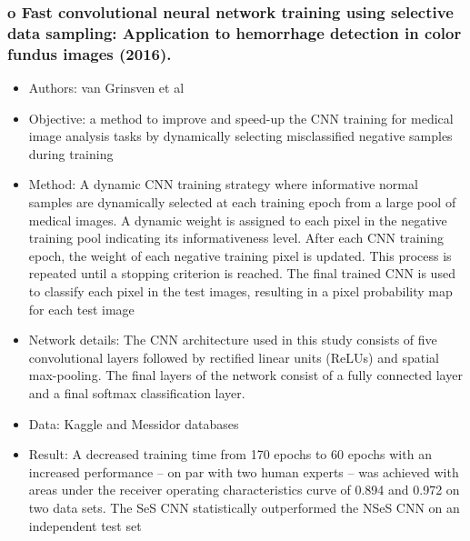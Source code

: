 \documentclass[12pt]{report}
\begin{document}
\subsubsection{o Fast convolutional neural network training using selective data sampling: Application to hemorrhage detection in color fundus images (2016). \cite{van2016fast}}
\begin{itemize}
\item Authors: van Grinsven et al
\item Objective: a method to improve and speed-up the CNN training for medical image analysis tasks by dynamically selecting misclassified negative samples during training
\item Method: A dynamic CNN training strategy where informative normal samples are dynamically selected at each training epoch from a large pool of medical images. A dynamic weight is assigned to each pixel in the negative training pool indicating its informativeness level. After each CNN training epoch, the weight of each negative training pixel is updated. This process is repeated until a stopping criterion is reached. The final trained CNN is used to classify each pixel in the test images, resulting in a pixel probability map for each test image
\item Network details: The CNN architecture used in this study consists of five convolutional layers followed by rectified linear units (ReLUs) and spatial max-pooling. The final layers of the network consist of a fully connected layer and a final softmax classification layer.
\item Data: Kaggle and Messidor databases
\item Result: A decreased training time from 170 epochs to 60 epochs with an increased performance – on par with two human experts – was achieved with areas under the receiver operating characteristics curve of 0.894 and 0.972 on two data sets. The SeS CNN statistically outperformed the NSeS CNN on an independent test set
\end{itemize}
\end{document}
